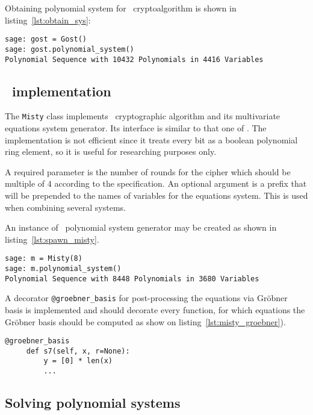 Obtaining polynomial system for \gost\ cryptoalgorithm is shown in
listing~\ref{lst:obtain_sys}:

\begin{lstlisting}[label=lst:obtain_sys, caption=Obtaining polynomial system]
sage: gost = Gost()
sage: gost.polynomial_system()
Polynomial Sequence with 10432 Polynomials in 4416 Variables
\end{lstlisting}


\subsection{\misty\ implementation}

The \verb+Misty+ class implements \misty\ cryptographic algorithm and its
multivariate equations system generator. Its interface is similar to that one of
\gost. The implementation is not
efficient since it treats every bit as a boolean polynomial ring element, so it
is useful for researching purposes only.

A required parameter is the number of rounds for the cipher which should be
multiple of $4$ according to the specification. An optional argument is a prefix
that will be prepended to the names of variables for the equations system. This
is used when combining several systems.

An instance of \misty\ polynomial system generator may be created as shown in
listing~\ref{lst:spawn_misty}.
\begin{lstlisting}[label=lst:spawn_misty, caption=Creating MISTY1 instance]
sage: m = Misty(8)
sage: m.polynomial_system()
Polynomial Sequence with 8448 Polynomials in 3680 Variables
\end{lstlisting}

A decorator \verb+@groebner_basis+ for post-processing the equations via
Gr\"obner basis is implemented and should decorate every function, for which
equations the Gr\"obner basis should be computed as show on
listing~\ref{lst:misty_groebner}).

\begin{lstlisting}[label=lst:misty_groebner, caption=Misty Gr\"obner basis]
     @groebner_basis
     def s7(self, x, r=None):
         y = [0] * len(x)
         ...
\end{lstlisting}


\subsection{Solving polynomial systems}
\label{sec:soft-solving}

